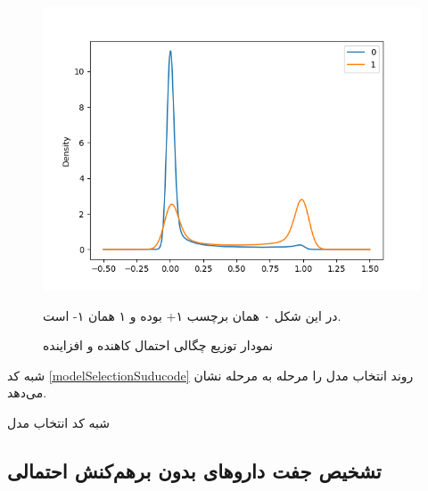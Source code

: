 \begin{figure}[!h]
	\centering
	\includegraphics[scale=0.9]{section3/densityDegEnh.png}
	\caption{
نمودار توزیع چگالی احتمال کاهنده و افزاینده
}
در این شکل ۰ همان  برچسب ۱+ بوده و ۱ همان ۱- است.
	\label{DDIProbHist}
\end{figure}

شبه کد 
\ref{modelSelectionSuducode}
روند انتخاب مدل را مرحله به مرحله نشان می‌دهد.

\renewcommand{\algorithmicrequire}{\textbf{ورودی:}}
\renewcommand{\algorithmicensure}{\textbf{خروجی:}}
\begin{algorithm}[!h]
\caption{شبه کد انتخاب مدل}
\label{modelSelectionSuducode}
\end{algorithm}


\subsection{تشخیص جفت داروهای بدون برهم‌کنش احتمالی}

